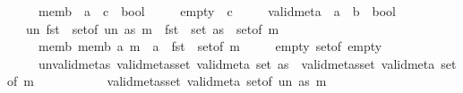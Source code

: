 \begin{isabellebody}
\ \ \ \ \ memb\ {\isacharcolon}{\kern0pt}{\isacharcolon}{\kern0pt}\ {\isachardoublequoteopen}{\isacharprime}{\kern0pt}a\ {\isasymRightarrow}\ {\isacharprime}{\kern0pt}c\ {\isasymRightarrow}\ bool{\isachardoublequoteclose}\isanewline
\ \ \ \ \ empty\ {\isacharcolon}{\kern0pt}{\isacharcolon}{\kern0pt}\ {\isacharprime}{\kern0pt}c\isanewline
\ \ \ \ \ valid{\isacharunderscore}{\kern0pt}meta\ {\isacharcolon}{\kern0pt}{\isacharcolon}{\kern0pt}\ {\isachardoublequoteopen}{\isacharprime}{\kern0pt}a\ {\isasymRightarrow}\ {\isacharprime}{\kern0pt}b\ {\isasymRightarrow}\ bool{\isachardoublequoteclose}\isanewline
\ \ \ un{\isacharcolon}{\kern0pt}\ {\isachardoublequoteopen}fst\ {\isacharbackquote}{\kern0pt}\ set{\isacharunderscore}{\kern0pt}of\ {\isacharparenleft}{\kern0pt}un\ as\ m{\isacharparenright}{\kern0pt}\ {\isacharequal}{\kern0pt}\ fst\ {\isacharbackquote}{\kern0pt}\ {\isacharparenleft}{\kern0pt}set\ as\ {\isasymunion}\ set{\isacharunderscore}{\kern0pt}of\ m{\isacharparenright}{\kern0pt}{\isachardoublequoteclose}\isanewline
\ \ \ \ \ memb{\isacharcolon}{\kern0pt}\ {\isachardoublequoteopen}memb\ a\ m\ {\isasymlongleftrightarrow}\ {\isacharparenleft}{\kern0pt}a\ {\isasymin}\ fst\ {\isacharbackquote}{\kern0pt}\ {\isacharparenleft}{\kern0pt}set{\isacharunderscore}{\kern0pt}of\ m{\isacharparenright}{\kern0pt}{\isacharparenright}{\kern0pt}{\isachardoublequoteclose}\isanewline
\ \ \ \ \ empty{\isacharcolon}{\kern0pt}\ {\isachardoublequoteopen}set{\isacharunderscore}{\kern0pt}of\ empty\ {\isacharequal}{\kern0pt}\ {\isacharbraceleft}{\kern0pt}{\isacharbraceright}{\kern0pt}{\isachardoublequoteclose}\isanewline
\ \ \ \ \ un{\isacharunderscore}{\kern0pt}valid{\isacharunderscore}{\kern0pt}metas{\isacharcolon}{\kern0pt}\ {\isachardoublequoteopen}valid{\isacharunderscore}{\kern0pt}metas{\isacharunderscore}{\kern0pt}set\ valid{\isacharunderscore}{\kern0pt}meta\ {\isacharparenleft}{\kern0pt}set\ as{\isacharparenright}{\kern0pt}\ {\isasymLongrightarrow}\ valid{\isacharunderscore}{\kern0pt}metas{\isacharunderscore}{\kern0pt}set\ valid{\isacharunderscore}{\kern0pt}meta\ {\isacharparenleft}{\kern0pt}set{\isacharunderscore}{\kern0pt}of\ m{\isacharparenright}{\kern0pt}\isanewline
\ \ \ \ \ \ \ \ \ \ {\isasymLongrightarrow}\ valid{\isacharunderscore}{\kern0pt}metas{\isacharunderscore}{\kern0pt}set\ valid{\isacharunderscore}{\kern0pt}meta\ {\isacharparenleft}{\kern0pt}set{\isacharunderscore}{\kern0pt}of\ {\isacharparenleft}{\kern0pt}un\ as\ m{\isacharparenright}{\kern0pt}{\isacharparenright}{\kern0pt}{\isachardoublequoteclose}\isanewline

\end{isabellebody}
